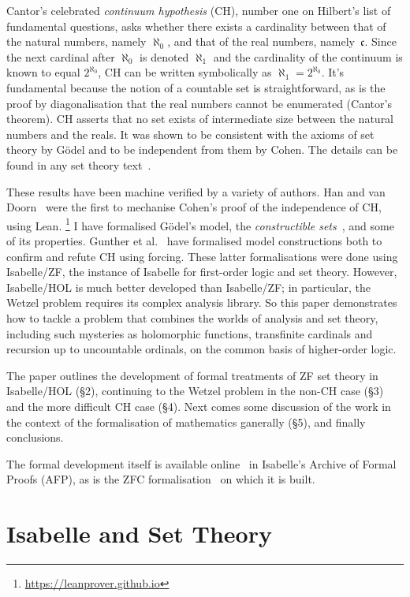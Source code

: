 \documentclass[runningheads]{llncs}
\begin{document}
Cantor's celebrated \textit{continuum hypothesis} (CH), number one on Hilbert's list of fundamental questions, asks whether there exists a cardinality between that of the natural numbers, namely $\aleph_0$, and that of the real numbers, namely~$\mathfrak{c}$.
Since the next cardinal after $\aleph_0$ is denoted $\aleph_1$ and the cardinality of the continuum is known to equal $2^{\aleph_0}$,  CH can be written symbolically as $\aleph_1 = 2^{\aleph_0}$.
It's fundamental because the notion of a countable set is straightforward, as is the proof by diagonalisation that the real numbers cannot be enumerated (Cantor's theorem).
CH asserts that no set exists of intermediate size between the natural numbers and the reals.
It was shown to be consistent with the axioms of set theory by Gödel and to be independent from them by Cohen.
The details can be found in any set theory text~\cite{kunen80}.

These results have been machine verified by a variety of authors.
Han and van Doorn~\cite{han-CH} were the first to mechanise Cohen's proof of the independence of CH, using Lean.%
\footnote{\url{https://leanprover.github.io}}
I have formalised Gödel's model, the \textit{constructible sets}~\cite{paulson-consistency}, and some of its properties.
Gunther et al.\ \cite{Independence_CH-AFP} have formalised model constructions both to confirm and refute CH using forcing.
These latter formalisations were done using Isabelle/ZF, the instance of Isabelle for first-order logic and set theory.
However, Isabelle/HOL is much better developed than Isabelle/ZF;
in particular, the Wetzel problem requires its complex analysis library. So this paper demonstrates how to tackle a problem that combines the worlds of analysis and set theory, including such mysteries as holomorphic functions, transfinite cardinals and recursion up to uncountable ordinals, on the common basis of higher-order logic.

The paper outlines the development of formal treatments of ZF set theory in Isabelle/HOL (\S2), continuing to the Wetzel problem in the non-CH case (\S3) and the more difficult CH case (\S4). Next comes some discussion of the work in the context of the formalisation of mathematics ganerally (\S5), and finally conclusions.

The formal development itself is available online~\cite{Wetzels_Problem-AFP} in Isabelle's Archive of Formal Proofs (AFP), as is the ZFC formalisation~\cite{ZFC_in_HOL-AFP} on which it is built.

\section{Isabelle and Set Theory}
\end{document}
